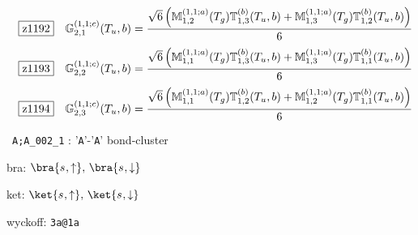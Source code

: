 \documentclass[fleqn,10pt,landscape]{jsarticle}
\begin{document}
\begin{dmath*}
\hspace*{3mm}\fbox{z1192}\quad \mathbb{G}_{2,1}^{(1,1;c)}(T_{u},b)=\frac{\sqrt{6} \left(\mathbb{M}_{1,2}^{(1,1;a)}(T_{g}) \mathbb{T}_{1,3}^{(b)}(T_{u},b) + \mathbb{M}_{1,3}^{(1,1;a)}(T_{g}) \mathbb{T}_{1,2}^{(b)}(T_{u},b)\right)}{6}
\end{dmath*}
\begin{dmath*}
\hspace*{3mm}\fbox{z1193}\quad \mathbb{G}_{2,2}^{(1,1;c)}(T_{u},b)=\frac{\sqrt{6} \left(\mathbb{M}_{1,1}^{(1,1;a)}(T_{g}) \mathbb{T}_{1,3}^{(b)}(T_{u},b) + \mathbb{M}_{1,3}^{(1,1;a)}(T_{g}) \mathbb{T}_{1,1}^{(b)}(T_{u},b)\right)}{6}
\end{dmath*}
\begin{dmath*}
\hspace*{3mm}\fbox{z1194}\quad \mathbb{G}_{2,3}^{(1,1;c)}(T_{u},b)=\frac{\sqrt{6} \left(\mathbb{M}_{1,1}^{(1,1;a)}(T_{g}) \mathbb{T}_{1,2}^{(b)}(T_{u},b) + \mathbb{M}_{1,2}^{(1,1;a)}(T_{g}) \mathbb{T}_{1,1}^{(b)}(T_{u},b)\right)}{6}
\end{dmath*}
\vspace{5mm}

\noindent\textbullet\, \texttt{A;A_002_1} : '\texttt{A}'-'\texttt{A}' bond-cluster

\noindent\quad * bra: $\bra{s_{},\uparrow},\, \bra{s_{},\downarrow}$

\noindent\quad * ket: $\ket{s_{},\uparrow},\, \ket{s_{},\downarrow}$

\noindent\quad * wyckoff: \texttt{3a@1a}
\end{document}
